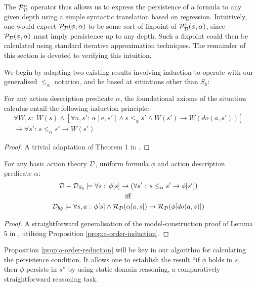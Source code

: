 The $\mathcal{P}_{\mathcal{D}}^{n}$ operator thus allows us to express the persistence
of a formula to any given depth using a simple syntactic translation
based on regression. Intuitively, one would expect $\mathcal{P}_{\mathcal{D}}(\phi,\alpha)$
to be some sort of fixpoint of $\mathcal{P}_{\mathcal{D}}^{1}(\phi,\alpha)$, since
$\mathcal{P}_{\mathcal{D}}(\phi,\alpha)$ must imply persistence up to any depth.
Such a fixpoint could then be calculated using standard iterative
approximation techniques. The remainder of this section is devoted
to verifying this intuition.

We begin by adapting two existing results involving induction to operate
with our generalised $\leq_{\alpha}$ notation, and be based at situations
other than $S_{0}$:

\begin{prop}
For any action description predicate $\alpha$, the foundational axioms
of the situation calculus entail the following induction principle:\label{prop:a-order-induction}\begin{multline*}
\forall W,s:\,\, W(s)\wedge\left[\forall a,s':\,\alpha[a,s']\wedge s\leq_{\alpha}s'\wedge W(s')\rightarrow W(do(a,s'))\right]\\
\rightarrow\forall s':\, s\leq_{\alpha}s'\rightarrow W(s')\end{multline*}

\end{prop}
\begin{proof}
A trivial adaptation of Theorem 1 in \citep{Reiter93proving}. 
\end{proof}
\begin{prop}
For any basic action theory $\mathcal{D}$, uniform formula $\phi$ and action
description predicate $\alpha$:\label{prop:a-order-reduction}\begin{gather*}
\mathcal{D}-\mathcal{D}_{S_{0}}\models\forall s:\,\phi[s]\rightarrow\left(\forall s':\, s\leq_{\alpha}s'\rightarrow\phi[s']\right)\\
\mathrm{iff}\\
\mathcal{D}_{bg}\models\forall s,a:\,\phi[s]\wedge\mathcal{R}_{\mathcal{D}}(\alpha[a,s])\rightarrow\mathcal{R}_{\mathcal{D}}(\phi[do(a,s)])\end{gather*}

\end{prop}
\begin{proof}
A straightforward generalisation of the model-construction proof of
Lemma 5 in \citep{Lin94-StateConstraints}, utilising Proposition
\ref{prop:a-order-induction}. 
\end{proof}
Proposition \ref{prop:a-order-reduction} will be key in our algorithm
for calculating the persistence condition. It allows one to establish
the result {}``if $\phi$ holds in $s$, then $\phi$ persists in
$s$'' by using static domain reasoning, a comparatively straightforward
reasoning task.

